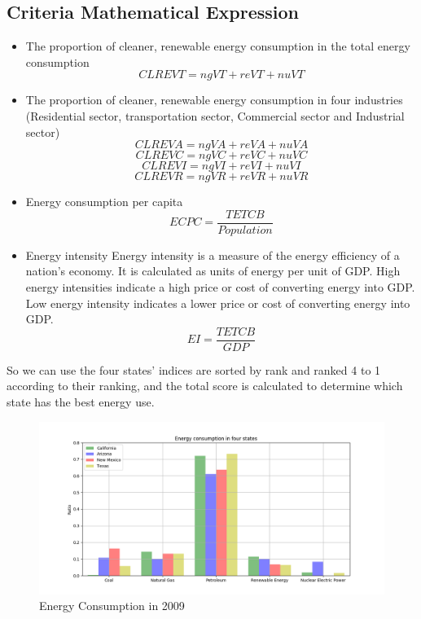 \documentclass{mcmthesis}
\begin{document}
\subsection{Criteria Mathematical Expression}
\begin{itemize}
  \item The proportion of cleaner, renewable energy consumption in the total energy consumption
        $$ CLREVT = ngVT + reVT + nuVT $$
  \item The proportion of cleaner, renewable energy consumption in four industries (Residential sector, transportation sector, Commercial sector and Industrial sector)
        $$ CLREVA = ngVA + reVA + nuVA$$
        $$ CLREVC = ngVC + reVC + nuVC$$
        $$ CLREVI = ngVI + reVI + nuVI$$
        $$ CLREVR = ngVR + reVR + nuVR$$
  \item Energy consumption per capita
        $$ ECPC = \frac{TETCB}{Population}$$
  \item Energy intensity
        Energy intensity\cite{5} is a measure of the energy efficiency of a nation's economy. It is calculated as units of energy per unit of GDP.
        High energy intensities indicate a high price or cost of converting energy into GDP.
        Low energy intensity indicates a lower price or cost of converting energy into GDP.
        $$ EI = \frac{TETCB}{GDP} $$
\end{itemize}
So we can use the four states' indices are sorted by rank and ranked 4 to 1 according to their ranking, and the total score is calculated to determine which state has the best energy use.
\begin{figure} [h]
\large
\centering
\includegraphics[width=12cm]{energy_2009.png}
\caption{Energy Consumption in 2009} \label{fig:b}
\end{figure}
\end{document}
